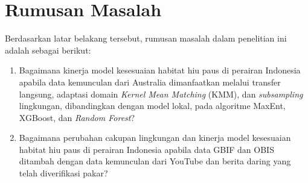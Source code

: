 \section{Rumusan Masalah}

Berdasarkan latar belakang tersebut, rumusan masalah dalam penelitian ini adalah
sebagai berikut:

\begin{enumerate}
    \item Bagaimana kinerja model kesesuaian habitat hiu paus di perairan
    Indonesia apabila data kemunculan dari Australia dimanfaatkan melalui
    transfer langsung, adaptasi domain \textit{Kernel Mean Matching} (KMM), dan
    \textit{subsampling} lingkungan, dibandingkan dengan model lokal, pada
    algoritme MaxEnt, XGBoost, dan \textit{Random Forest}?
    \item Bagaimana perubahan cakupan lingkungan dan kinerja model kesesuaian
    habitat hiu paus di perairan Indonesia apabila data GBIF dan OBIS ditambah
    dengan data kemunculan dari YouTube dan berita daring yang telah
    diverifikasi pakar?
\end{enumerate}

